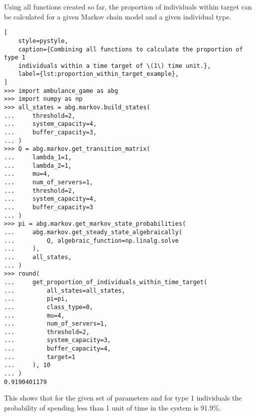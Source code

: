 Using all functions created so far, the proportion of individuals within target
can be calculated for a given Markov chain model and a given individual type.

\begin{lstlisting}[
    style=pystyle,
    caption={Combining all functions to calculate the proportion of type 1 
    individuals within a time target of \(1\) time unit.},
    label={lst:proportion_within_target_example},
]
>>> import ambulance_game as abg
>>> import numpy as np
>>> all_states = abg.markov.build_states(
...     threshold=2,
...     system_capacity=4,
...     buffer_capacity=3,
... )
>>> Q = abg.markov.get_transition_matrix(
...     lambda_1=1,
...     lambda_2=1,
...     mu=4,
...     num_of_servers=1,
...     threshold=2,
...     system_capacity=4,
...     buffer_capacity=3
... )
>>> pi = abg.markov.get_markov_state_probabilities(
...     abg.markov.get_steady_state_algebraically(
...         Q, algebraic_function=np.linalg.solve
...     ),
...     all_states,
... )
>>> round(
...     get_proportion_of_individuals_within_time_target(
...         all_states=all_states,
...         pi=pi,
...         class_type=0,
...         mu=4,
...         num_of_servers=1,
...         threshold=2,
...         system_capacity=3,
...         buffer_capacity=4,
...         target=1
...     ), 10
... )
0.9190401179

\end{lstlisting}

This shows that for the given set of parameters and for type 1 individuals
the probability of spending less than 1 unit of time in the system is 91.9\%.
